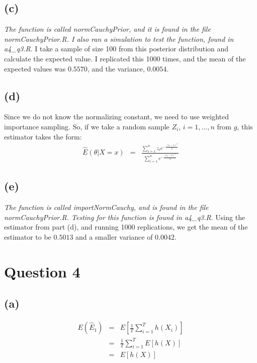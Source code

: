\documentclass{article}\usepackage[]{graphicx}\usepackage[]{color}
\begin{document}
\subsection*{(c)}
\emph{The function is called normCauchyPrior, and it is found in the file normCauchyPrior.R.  I also ran a simulation to test the function, found in a4\_q3.R}.  I take a sample of size 100 from this posterior distribution and calculate the expected value.  I replicated this 1000 times, and the mean of the expected values was $0.5570$, and the variance, $0.0054$.

\subsection*{(d)}
Since we do not know the normalizing constant, we need to use weighted importance sampling. So, if we take a random sample $Z_i$, $i=1,\dots,n$ from $g$, this estimator takes the form:
\begin{eqnarray*}
  \hat{E}(\theta | X=x) &=& \frac{\sum_{i=1}^n z_i e^{-\frac{(z_i-x)^2}{2}}}{\sum_{i=1}^n e^{-\frac{(z_i-x)^2}{2}}}
\end{eqnarray*}

\subsection*{(e)}
\emph{The function is called importNormCauchy, and is found in the file normCauchyPrior.R.  Testing for this function is found in a4\_q3.R}. Using the estimator from part (d), and running 1000 replications, we get the mean of the estimator to be $0.5013$ and a smaller variance of $0.0042$.

\section*{Question 4}
\subsection*{(a)}
\begin{eqnarray*}
  E(\hat{E}_1) &=& E\left[ \frac{1}{T}\sum_{i=1}^T h(X_i) \right] \\
  &=& \frac{1}{T}\sum_{i=1}^T E\left[h(X)\right] \\
  &=& E\left[h(X)\right]
\end{eqnarray*}
\end{document}
